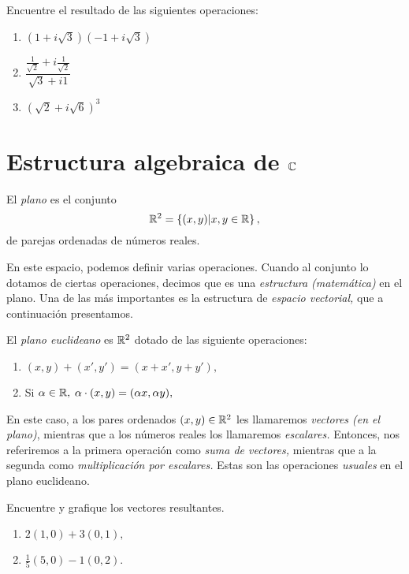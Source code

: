 \begin{problema}
\label{exe:1.1.1}
 Encuentre el resultado de las siguientes operaciones:
 \begin{enumerate}
  \item $\left( 1+i\sqrt{3} \right)\left( -1 +i\sqrt{3} \right)$
  \item $\dfrac{\frac{1}{\sqrt{2}}+i\frac{1}{\sqrt{2}}}{\sqrt{3}+i1}$
  \item $\left( \sqrt{2}+i\sqrt{6} \right)^{3}$
 \end{enumerate}

\end{problema}

\section{Estructura algebraica de $\mathbb{C}$}

\begin{definicion}El \emph{plano} es el conjunto
	$$
	\mathbb{R}^{2}=\left\{ (x,y)|x,y\in \mathbb{R}  \right\},
	$$
	de parejas ordenadas de números reales.
\end{definicion}

En este espacio, podemos definir varias operaciones. Cuando al conjunto lo dotamos de ciertas operaciones, decimos que
es una \emph{estructura (matemática)} en el plano. Una de las más importantes es la estructura de \emph{espacio
	vectorial,} que a continuación presentamos.

\begin{definicion} El \emph{plano euclideano} es $\mathbb{R}^{2}$ dotado de las siguiente operaciones:
	\begin{enumerate}
		\item 
		$
		(x,y)+(x',y')=(x+x',y+y'),
		$
		\item Si $\alpha \in \mathbb{R},$
		$
		\alpha\cdot(x,y)=(\alpha x,\alpha y),
		$
	\end{enumerate}
\end{definicion}

\begin{observacion}
	En este caso, a los pares ordenados $(x,y)\in \mathbb{R}^{2}$ les llamaremos \emph{vectores (en el plano)}, mientras que a los
	números reales los llamaremos \emph{escalares.} Entonces, nos referiremos a la primera operación como \emph{suma de
		vectores,} mientras que a la segunda como \emph{multiplicación por escalares.} Estas son las operaciones \emph{usuales}
	en el plano euclideano.
\end{observacion}


\begin{problema}
	Encuentre y grafique los vectores resultantes.
	\begin{enumerate}
		\item $2(1,0)+3(0,1),$
		\item $\frac{1}{5}(5,0)-1(0,2).$
	\end{enumerate}
	
\end{problema}

